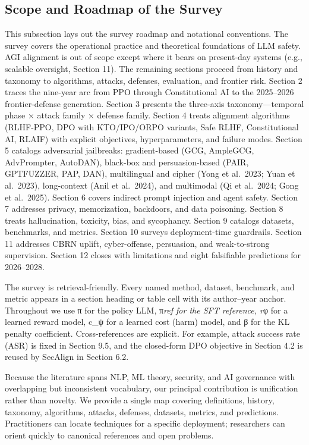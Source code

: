 \subsection{Scope and Roadmap of the Survey}\label{scope-and-roadmap-of-the-survey}

This subsection lays out the survey roadmap and notational conventions. The survey covers the operational practice and theoretical foundations of LLM safety. AGI alignment is out of scope except where it bears on present-day systems (e.g., scalable oversight, Section 11). The remaining sections proceed from history and taxonomy to algorithms, attacks, defenses, evaluation, and frontier risk. Section 2 traces the nine-year arc from PPO through Constitutional AI to the 2025--2026 frontier-defense generation. Section 3 presents the three-axis taxonomy---temporal phase × attack family × defense family. Section 4 treats alignment algorithms (RLHF-PPO, DPO with KTO/IPO/ORPO variants, Safe RLHF, Constitutional AI, RLAIF) with explicit objectives, hyperparameters, and failure modes. Section 5 catalogs adversarial jailbreaks: gradient-based (GCG, AmpleGCG, AdvPrompter, AutoDAN), black-box and persuasion-based (PAIR, GPTFUZZER, PAP, DAN), multilingual and cipher (Yong et al.~2023; Yuan et al.~2023), long-context (Anil et al.~2024), and multimodal (Qi et al.~2024; Gong et al.~2025). Section 6 covers indirect prompt injection and agent safety. Section 7 addresses privacy, memorization, backdoors, and data poisoning. Section 8 treats hallucination, toxicity, bias, and sycophancy. Section 9 catalogs datasets, benchmarks, and metrics. Section 10 surveys deployment-time guardrails. Section 11 addresses CBRN uplift, cyber-offense, persuasion, and weak-to-strong supervision. Section 12 closes with limitations and eight falsifiable predictions for 2026--2028.

The survey is retrieval-friendly. Every named method, dataset, benchmark, and metric appears in a section heading or table cell with its author--year anchor. Throughout we use π for the policy LLM, π\emph{ref for the SFT reference, r}φ for a learned reward model, c\_ψ for a learned cost (harm) model, and β for the KL penalty coefficient. Cross-references are explicit. For example, attack success rate (ASR) is fixed in Section 9.5, and the closed-form DPO objective in Section 4.2 is reused by SecAlign in Section 6.2.

Because the literature spans NLP, ML theory, security, and AI governance with overlapping but inconsistent vocabulary, our principal contribution is unification rather than novelty. We provide a single map covering definitions, history, taxonomy, algorithms, attacks, defenses, datasets, metrics, and predictions. Practitioners can locate techniques for a specific deployment; researchers can orient quickly to canonical references and open problems.


